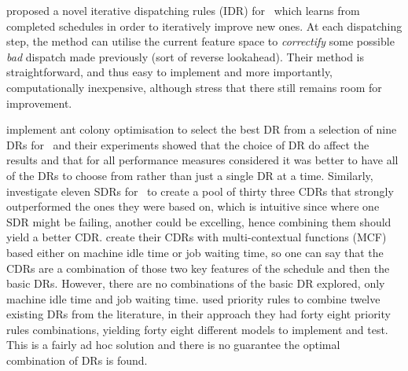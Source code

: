 \citet{Nguyen13} proposed a novel iterative dispatching rules (IDR) for \JSP\ which learns from completed schedules in order to iteratively improve new ones. At each dispatching step, the method can utilise the current feature space to \emph{correctify} some possible \emph{bad} dispatch made previously (sort of reverse lookahead).
Their method is straightforward, and thus easy to implement and more importantly, computationally inexpensive, although \citeauthor{Nguyen13} stress that there still remains room for improvement. 

\citet{Korytkowski13} implement ant colony optimisation to select the best DR from a selection of nine DRs for \JSP\ and their experiments showed that the choice of DR do affect the results and that for all performance measures considered it was better to have all of the DRs to choose from rather than just a single DR at a time. 
Similarly, \citet{Lu13} investigate eleven SDRs for \JSP\ to create a pool of thirty three CDRs that strongly outperformed the ones they were based on, which is intuitive since where one SDR might be failing, another could be excelling, hence combining them should yield a better CDR. \citeauthor{Lu13} create their CDRs with multi-contextual functions (MCF) based either on machine idle time or job waiting time, so one can say that the CDRs are a combination of those two key features of the schedule and then the basic DRs. However, there are no combinations of the basic DR explored, only machine idle time and job waiting time.  
\citet{Yu13} used priority rules to combine twelve existing DRs from the literature, in their approach they had forty eight priority rules combinations, yielding forty eight different models to implement and test. This is a fairly ad hoc solution and there is no guarantee the optimal combination of DRs is found. 

\clearpage
